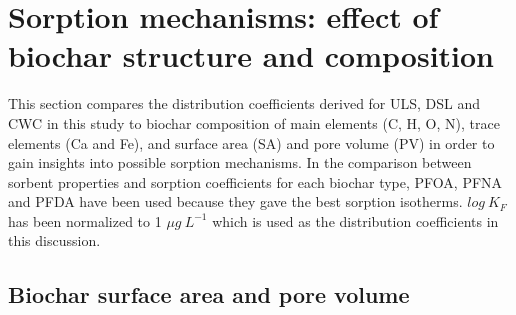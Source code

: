 
\section{Sorption mechanisms: effect of biochar structure and composition}
This section compares the distribution coefficients derived for ULS, DSL and CWC in this study to biochar composition of main elements (C, H, O, N), trace elements (Ca and Fe), and surface area (SA) and pore volume (PV) in order to gain insights into possible sorption mechanisms. In the comparison between sorbent properties and sorption coefficients for each biochar type, PFOA, PFNA and PFDA have been used because they gave the best sorption isotherms. $log~K_F$ has been normalized to 1 $\mu g~L^{-1}$ which is used as the distribution coefficients in this discussion.

\subsection{Biochar surface area and pore volume}
